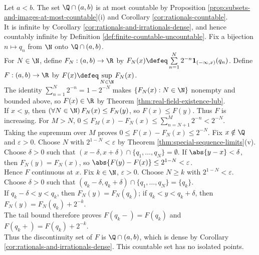 \begin{counterexample} \label{cex:monotone-discontinuities-need-not-be-isolated} \\
Let $a<b$. The set $\Q\cap(a,b)$ is at most countable by Proposition \ref{prop:subsets-and-images-at-most-countable}(i) and Corollary \ref{cor:rationals-countable}.\\
It is infinite by Corollary \ref{cor:rationals-and-irrationals-dense}, and hence countably infinite by Definition \ref{def:finite-countable-uncountable}. Fix a bijection $n\mapsto q_n$ from $\N$ onto $\Q\cap(a,b)$.\\
For $N\in\N$, define $F_N:(a,b)\to\R$ by $F_N(x)\defeq\sum\limits_{n=1}^{N}2^{-n}\mathbf{1}_{(-\infty,x)}(q_n)$. Define $F:(a,b)\to\R$ by $F(x)\defeq\sup\limits_{N\in\N}F_N(x)$.\\
The identity $\sum\limits_{n=1}^{N}2^{-n}=1-2^{-N}$ makes $\{F_N(x):N\in\N\}$ nonempty and bounded above, so $F(x)\in\R$ by Theorem \ref{thm:real-field-existence-lub}.\\
If $x<y$, then $(\forall N\in\N)\,F_N(x)\leq F_N(y)$, so $F(x)\leq F(y)$. Thus $F$ is increasing. For $M>N$, $0\leq F_M(x)-F_N(x)\leq\sum\limits_{n=N+1}^{M}2^{-n}<2^{-N}$.\\
Taking the supremum over $M$ proves $0\leq F(x)-F_N(x)\leq2^{-N}$. Fix $x\notin\Q$ and $\varepsilon>0$. Choose $N$ with $2^{1-N}<\varepsilon$ by Theorem \ref{thm:special-sequence-limits}(v).\\
Choose $\delta>0$ such that $(x-\delta,x+\delta)\cap\{q_1,\ldots,q_N\}=\emptyset$. If $\abs{y-x}<\delta$, then $F_N(y)=F_N(x)$, so $\abs{F(y)-F(x)}\leq2^{1-N}<\varepsilon$.\\
Hence $F$ continuous at $x$. Fix $k\in\N$, $\varepsilon>0$. Choose $N\geq k$ with $2^{1-N}<\varepsilon$. Choose $\delta>0$ such that $(q_k-\delta,q_k+\delta)\cap\{q_1,\ldots,q_N\}=\{q_k\}$.\\
If $q_k-\delta<y<q_k$, then $F_N(y)=F_N(q_k)$; if $q_k<y<q_k+\delta$, then $F_N(y)=F_N(q_k)+2^{-k}$.\\
The tail bound therefore proves $F(q_k-)=F(q_k)$ and $F(q_k+)=F(q_k)+2^{-k}$.\\
Thus the discontinuity set of $F$ is $\Q\cap(a,b)$, which is dense by Corollary \ref{cor:rationals-and-irrationals-dense}. This countable set has no isolated points.
\end{counterexample}

